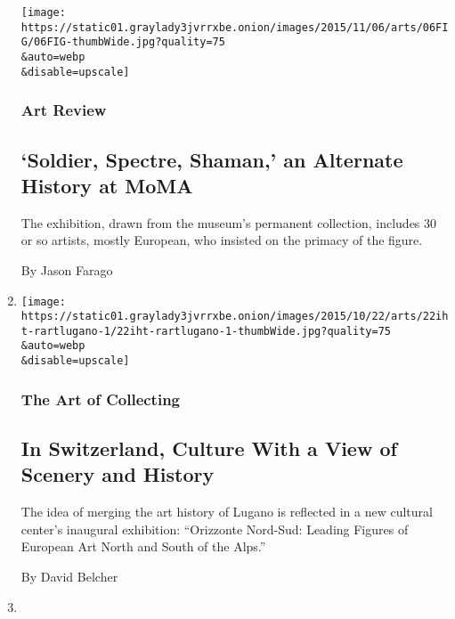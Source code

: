 \begin{enumerate}
  \texttt{[image: https://static01.graylady3jvrrxbe.onion/images/2015/11/06/arts/06FIG/06FIG-thumbWide.jpg?quality=75\\\&auto=webp\\\&disable=upscale]}

  \hypertarget{art-review-1}{%
  \subsubsection{Art Review}\label{art-review-1}}

  \hypertarget{soldier-spectre-shaman-an-alternate-history-at-moma}{%
  \subsection{`Soldier, Spectre, Shaman,' an Alternate History at
  MoMA}\label{soldier-spectre-shaman-an-alternate-history-at-moma}}

  The exhibition, drawn from the museum's permanent collection, includes
  30 or so artists, mostly European, who insisted on the primacy of the
  figure.

  By Jason Farago
\item
  \href{/2015/10/22/arts/international/in-switzerland-culture-with-a-view-of-scenery-and-history.html}{}

  \texttt{[image: https://static01.graylady3jvrrxbe.onion/images/2015/10/22/arts/22iht-rartlugano-1/22iht-rartlugano-1-thumbWide.jpg?quality=75\\\&auto=webp\\\&disable=upscale]}

  \hypertarget{the-art-of-collecting}{%
  \subsubsection{The Art of Collecting}\label{the-art-of-collecting}}

  \hypertarget{in-switzerland-culture-with-a-view-of-scenery-and-history}{%
  \subsection{In Switzerland, Culture With a View of Scenery and
  History}\label{in-switzerland-culture-with-a-view-of-scenery-and-history}}

  The idea of merging the art history of Lugano is reflected in a new
  cultural center's inaugural exhibition: ``Orizzonte Nord-Sud: Leading
  Figures of European Art North and South of the Alps.''

  By David Belcher
\item
  \href{/2015/05/14/upshot/the-179-million-picasso-that-explains-global-inequality.html}{}


\end{enumerate}
